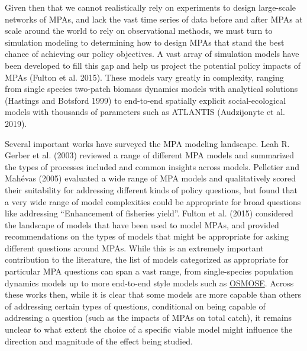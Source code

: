 \documentclass[
  default,
  lineno,
  referee]{sn-jnl}
\begin{document}
Given then that we cannot realistically rely on experiments to design
large-scale networks of MPAs, and lack the vast time series of data
before and after MPAs at scale around the world to rely on observational
methods, we must turn to simulation modeling to determining how to
design MPAs that stand the best chance of achieving our policy
objectives. A vast array of simulation models have been developed to
fill this gap and help us project the potential policy impacts of MPAs
(Fulton et al. 2015). These models vary greatly in complexity, ranging
from single species two-patch biomass dynamics models with analytical
solutions (Hastings and Botsford 1999) to end-to-end spatially explicit
social-ecological models with thousands of parameters such as ATLANTIS
(Audzijonyte et al. 2019).

Several important works have surveyed the MPA modeling landscape. Leah
R. Gerber et al. (2003) reviewed a range of different MPA models and
summarized the types of processes included and common insights across
models. Pelletier and Mahévas (2005) evaluated a wide range of MPA
models and qualitatively scored their suitability for addressing
different kinds of policy questions, but found that a very wide range of
model complexities could be appropriate for broad questions like
addressing ``Enhancement of fisheries yield''. Fulton et al. (2015)
considered the landscape of models that have been used to model MPAs,
and provided recommendations on the types of models that might be
appropriate for asking different questions around MPAs. While this is an
extremely important contribution to the literature, the list of models
categorized as appropriate for particular MPA questions can span a vast
range, from single-species population dynamics models up to more
end-to-end style models such as
\href{https://osmose-model.org/publications/}{OSMOSE}. Across these
works then, while it is clear that some models are more capable than
others of addressing certain types of questions, conditional on being
capable of addressing a question (such as the impacts of MPAs on total
catch), it remains unclear to what extent the choice of a specific
viable model might influence the direction and magnitude of the effect
being studied.
\end{document}

